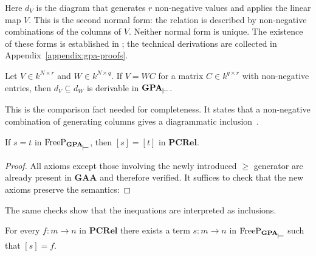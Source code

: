 Here $d_V$ is the diagram that generates $r$ non-negative values and
applies the linear map $V$. This is the second normal form: the relation
is described by non-negative combinations of the columns of $V$.
Neither normal form is unique.
The existence of these forms is established in
\cite[Theorems~14 and~18]{bonchi2021polyhedral}; the technical derivations
are collected in Appendix~\ref{appendix:gpa-proofs}.

\begin{lemma}\label{lem:gpa-comparison}
    Let $V\in k^{N\times r}$ and $W\in k^{N\times q}$.
    If $V=WC$ for a matrix $C\in k^{q\times r}$ with non-negative
    entries, then $d_V\subseteq d_W$ is derivable in
    $\mathbf{GPA}_{\rtop}$.
\end{lemma}

This is the comparison fact needed for completeness. It states that a
non-negative combination of generating columns gives a diagrammatic
inclusion~\cite[Lemmas~49--50]{bonchi2021polyhedral}.


\begin{lemma}[Soundness]
    If $s=t$ in $\mathrm{FreeP}_{\mathbf{GPA}_{\rtop}}$, then
    $[s]=[t]$ in $\mathbf{PCRel}$.
\end{lemma}

\begin{proof}
    All axioms except those involving the newly introduced $\ge$
    generator are already present in $\mathbf{GAA}$ and therefore
    verified. It suffices to check that the new axioms preserve the
    semantics:

    
\end{proof}

The same checks show that the inequations are interpreted as inclusions.

\begin{lemma}[Expressivity]
    For every $f:m\to n$ in $\mathbf{PCRel}$ there exists a term
    $s:m\to n$ in $\mathrm{FreeP}_{\mathbf{GPA}_{\rtop}}$ such that $[s]=f$.
\end{lemma}

